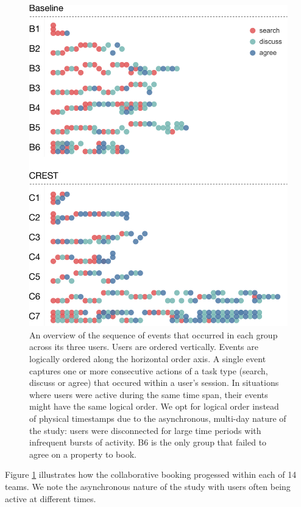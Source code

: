 \begin{figure}
    \centering
    \includegraphics[width=1\linewidth]{images/logical-timelines.pdf}
    \caption{An overview of the sequence of events that occurred in each group across its three users. Users are ordered vertically. Events are logically ordered along the horizontal order axis. A single event captures one or more consecutive actions of a task type (search, discuss or agree) that occured within a user's session. In situations where users were active during the same time span, their events might have the same logical order. We opt for logical order instead of physical timestamps due to the asynchronous, multi-day nature of the study: users were disconnected for large time periods with infrequent bursts of activity. B6 is the only group that failed to agree on a property to book.}
    \label{fig:timelines}
\end{figure}

Figure \ref{fig:timelines} illustrates how the collaborative booking progessed within each of 14 teams. We note the asynchronous nature of the study with users often being active at different times. 

